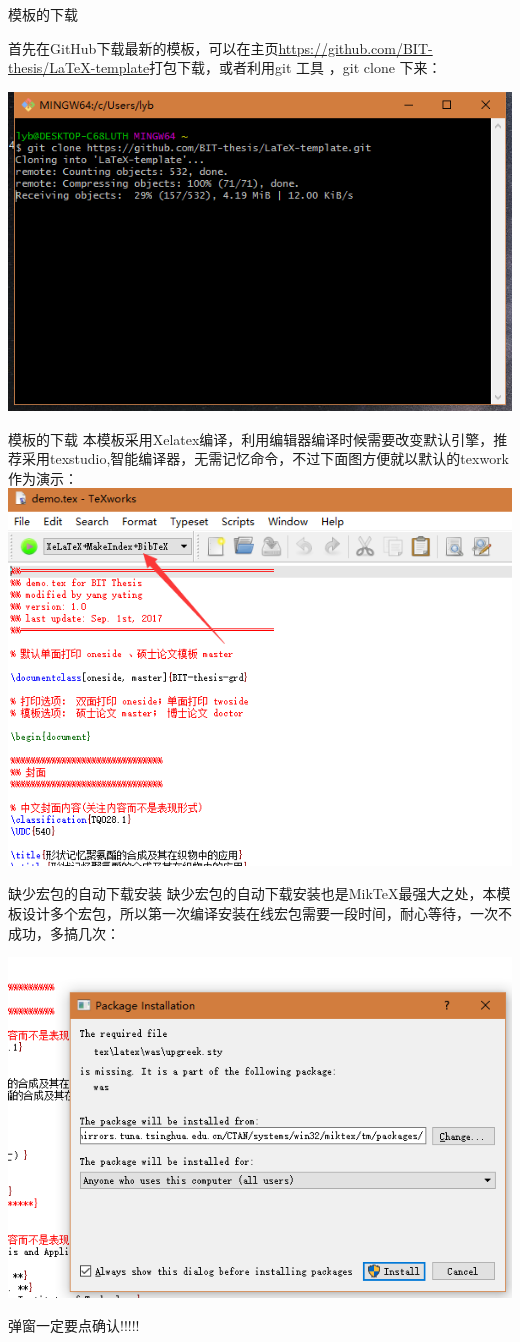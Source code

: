 \documentclass[sectioncirclenumberstyle]{le2iutbmbeamer}
\begin{document}
\begin{frame}{模板的下载}

首先在GitHub下载最新的模板，可以在主页\url{https://github.com/BIT-thesis/LaTeX-template}打包下载，或者利用git 工具 ，git clone 下来：

\includegraphics[width=0.7\linewidth]{figures/4}
\end{frame}

\begin{frame}{模板的下载}
本模板采用Xelatex编译，利用编辑器编译时候需要改变默认引擎，推荐采用texstudio,智能编译器，无需记忆命令，不过下面图方便就以默认的texwork作为演示：
\includegraphics[width=0.7\linewidth]{figures/5}
\end{frame}

\begin{frame}{缺少宏包的自动下载安装}
缺少宏包的自动下载安装也是Mik\TeX{}最强大之处，本模板设计多个宏包，所以第一次编译安装在线宏包需要一段时间，耐心等待，一次不成功，多搞几次：

\includegraphics[width=0.7\linewidth]{figures/6}

\alert{弹窗一定要点确认!!!!!}
\end{frame}
\end{document}
